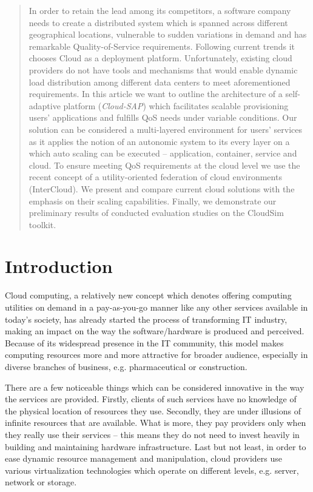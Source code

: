 \documentclass[twocolumn]{svjour3}          %
\begin{document}
\begin{abstract}
In order to retain the lead among its competitors, a software company needs to create a distributed system which is spanned across different geographical locations, vulnerable to sudden variations in demand and has remarkable Quality-of-Service requirements. Following current trends it chooses Cloud as a deployment platform. Unfortunately, existing cloud providers do not have tools and mechanisms that would enable dynamic load distribution among different data centers to meet aforementioned requirements.
In this article we want to outline the architecture of a self-adaptive platform (\emph{Cloud-SAP}) which facilitates scalable provisioning users' applications and fulfills QoS needs under variable conditions. Our solution can be considered a multi-layered environment for users' services as it applies the notion of an autonomic system to its every layer on a which auto scaling can be executed -- application, container, service and cloud. To ensure meeting QoS requirements at the cloud level we use the recent concept of a utility-oriented federation of cloud environments (InterCloud).
We present and compare current cloud solutions with the emphasis on their scaling capabilities. Finally, we demonstrate our preliminary results of conducted evaluation studies on the CloudSim toolkit. 

\end{abstract}

\section{Introduction}
\label{intro}
Cloud computing, a relatively new concept which denotes offering computing utilities on demand in a pay-as-you-go manner like any other services available in today's society, has already started the process of transforming IT industry, making an impact on the way the software/hardware is produced and perceived. Because of its widespread presence in the IT community, this model makes computing resources more and more attractive for broader audience, especially in diverse branches of business, e.g. pharmaceutical or construction.

There are a few noticeable things which can be considered innovative in the way the services are provided. Firstly, clients of such services have no knowledge of the physical location of resources they use. Secondly, they are under illusions of infinite resources that are available. What is more, they pay providers only when they really use their services -- this means they do not need to invest heavily in building and maintaining hardware infrastructure. Last but not least, in order to ease dynamic resource management and manipulation, cloud providers use various virtualization technologies which operate on different levels, e.g. server, network or storage.
\end{document}
